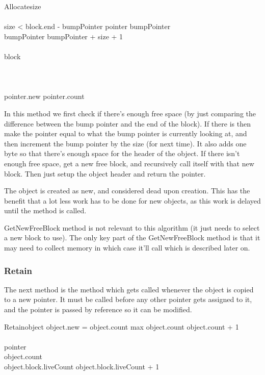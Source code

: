 \documentclass{article}
\begin{document}
\begin{pseudocode}{Allocate}{size}
	\\\\
	\IF size < block.end - bumpPointer \THEN
		\BEGIN
			pointer \GETS bumpPointer\\
			bumpPointer \GETS bumpPointer + size + 1\\
		\END\\
	\ELSE
		\BEGIN
			block \GETS {}\\
			\\
		\END\\\\
	pointer.new \GETS \TRUE
	pointer.count 
\end{pseudocode}

In this method we first check if there's enough free space (by just comparing the difference between the bump pointer and the end of the block). If there is then make the pointer equal to what the bump pointer is currently looking at, and then increment the bump pointer by the size (for next time). It also adds one byte so that there's enough space for the header of the object. If there isn't enough free space, get a new free block, and recursively call itself with that new block. Then just setup the object header and return the pointer. 

The object is created as new, and considered dead upon creation. This has the benefit that a lot less work has to be done for new objects, as this work is delayed until the  method is called.

GetNewFreeBlock method is not relevant to this algorithm (it just needs to select a new block to use). The only key part of the GetNewFreeBlock method is that it may need to collect memory in which case it'll call  which is described later on.

\subsubsection{Retain}

The next method is the  method which gets called whenever the object is copied to a new pointer. It must be called before any other pointer gets assigned to it, and the pointer is passed by reference so it can be modified.

\begin{pseudocode}{Retain}{object}
	\IF object.new = \FALSE \THEN
	\BEGIN
		\IF object.count \NOT max \THEN
		object.count \GETS object.count + 1\\
		\RETURN{}
	\END\\
	pointer \GETS {}\\
	object.count \\
	object.block.liveCount \GETS object.block.liveCount + 1
	\RETURN{}\\
\end{pseudocode}
\end{document}
